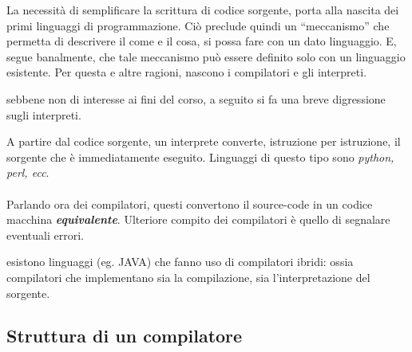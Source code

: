 \documentclass{subfiles}
\begin{document}
La necessità di semplificare la scrittura di codice sorgente, porta alla nascita dei primi linguaggi di programmazione.
Ciò preclude quindi un ``meccanismo'' che permetta di descrivere il come e il cosa, si possa fare con un dato linguaggio.
E, segue banalmente, che tale meccanismo può essere definito solo con un linguaggio esistente.
Per questa e altre ragioni, nascono i compilatori e gli interpreti.

\begin{Note*}
    sebbene non di interesse ai fini del corso, a seguito si fa una breve digressione sugli interpreti.
\end{Note*}
A partire dal codice sorgente, un interprete converte, istruzione per istruzione, il sorgente che è immediatamente eseguito.
Linguaggi di questo tipo sono \emph{python, perl, ecc}.
\\ \\
Parlando ora dei compilatori, questi convertono il source-code in un codice macchina \emph{\textbf{equivalente}}.
Ulteriore compito dei compilatori è quello di segnalare eventuali errori.

\begin{Note*}
    esistono linguaggi (eg. JAVA) che fanno uso di compilatori ibridi: ossia compilatori che implementano sia la compilazione,
    sia l'interpretazione del sorgente.
\end{Note*}

\subsection{Struttura di un compilatore}

\clearpage
\end{document}
